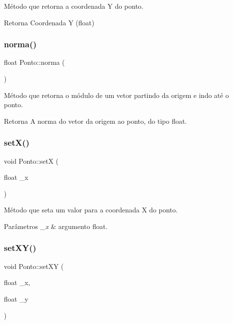 Método que retorna a coordenada Y do ponto. 

\begin{DoxyReturn}{Retorna}
Coordenada Y (float) 
\end{DoxyReturn}
\mbox{\label{classPonto_a9b0ddbdddd05edbc4d45ef0671a628c6}} 
\subsubsection{\texorpdfstring{norma()}{norma()}}
{\footnotesize\ttfamily float Ponto\+::norma (\begin{DoxyParamCaption}{ }\end{DoxyParamCaption})}



Método que retorna o módulo de um vetor partindo da origem e indo até o ponto. 

\begin{DoxyReturn}{Retorna}
A norma do vetor da origem ao ponto, do tipo float. 
\end{DoxyReturn}
\mbox{\label{classPonto_a22129ad4dbf8019c479021d70a9f6774}} 
\subsubsection{\texorpdfstring{set\+X()}{setX()}}
{\footnotesize\ttfamily void Ponto\+::setX (\begin{DoxyParamCaption}\item[{float}]{\+\_\+x }\end{DoxyParamCaption})}



Método que seta um valor para a coordenada X do ponto. 


\begin{DoxyParams}{Parâmetros}
{\em \+\_\+x} & argumento float. \\
\hline
\end{DoxyParams}
\mbox{\label{classPonto_a827488219a7da184d440f687cec49ce6}} 
\subsubsection{\texorpdfstring{set\+X\+Y()}{setXY()}}
{\footnotesize\ttfamily void Ponto\+::set\+XY (\begin{DoxyParamCaption}\item[{float}]{\+\_\+x,  }\item[{float}]{\+\_\+y }\end{DoxyParamCaption})}



